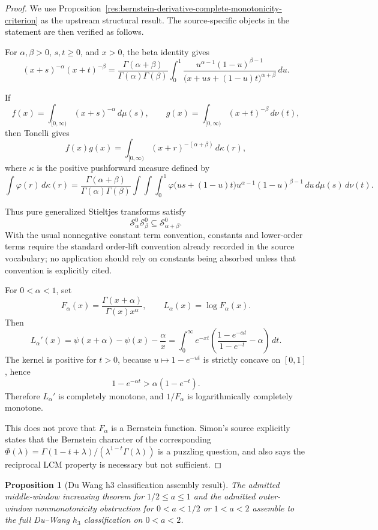 \documentclass[11pt]{article}
\numberwithin{equation}{section}
\newtheorem{proposition}[theorem]{Proposition}
\theoremstyle{definition}
\theoremstyle{remark}
\newcommand{\1}{\mathbf 1}
\begin{document}
\begin{proof}
We use Proposition~\ref{res:bernstein-derivative-complete-monotonicity-criterion} as the upstream structural result. The source-specific objects in the statement are then verified as follows.

For \(\alpha,\beta>0\), \(s,t\ge0\), and \(x>0\), the beta identity gives
\[
(x+s)^{-\alpha}(x+t)^{-\beta}
=
\frac{\Gamma(\alpha+\beta)}{\Gamma(\alpha)\Gamma(\beta)}
\int_0^1
\frac{u^{\alpha-1}(1-u)^{\beta-1}}
{\bigl(x+us+(1-u)t\bigr)^{\alpha+\beta}}
\,du.
\]

If
\[
f(x)=\int_{[0,\infty)}(x+s)^{-\alpha}\,d\mu(s),
\qquad
g(x)=\int_{[0,\infty)}(x+t)^{-\beta}\,d\nu(t),
\]
then Tonelli gives
\[
f(x)g(x)=\int_{[0,\infty)}(x+r)^{-(\alpha+\beta)}\,d\kappa(r),
\]
where \(\kappa\) is the positive pushforward measure defined by
\[
\int \varphi(r)\,d\kappa(r)
=
\frac{\Gamma(\alpha+\beta)}{\Gamma(\alpha)\Gamma(\beta)}
\int\!\!\int\!\!\int_0^1
\varphi\bigl(us+(1-u)t\bigr)
u^{\alpha-1}(1-u)^{\beta-1}
\,du\,d\mu(s)\,d\nu(t).
\]

Thus pure generalized Stieltjes transforms satisfy
\[
\mathcal S_\alpha^{0}\mathcal S_\beta^{0}\subseteq \mathcal S_{\alpha+\beta}^{0}.
\]
With the usual nonnegative constant term convention, constants and lower-order terms require the standard order-lift convention already recorded in the source vocabulary; no application should rely on constants being absorbed unless that convention is explicitly cited.

For \(0<\alpha<1\), set
\[
F_\alpha(x)=\frac{\Gamma(x+\alpha)}{\Gamma(x)x^\alpha},
\qquad
L_\alpha(x)=\log F_\alpha(x).
\]
Then
\[
L_\alpha'(x)
=
\psi(x+\alpha)-\psi(x)-\frac{\alpha}{x}
=
\int_0^\infty e^{-xt}
\left(
\frac{1-e^{-\alpha t}}{1-e^{-t}}-\alpha
\right)\,dt.
\]
The kernel is positive for \(t>0\), because \(u\mapsto 1-e^{-ut}\) is strictly concave on \([0,1]\), hence
\[
1-e^{-\alpha t}>\alpha(1-e^{-t}).
\]
Therefore \(L_\alpha'\) is completely monotone, and \(1/F_\alpha\) is logarithmically completely monotone.

This does not prove that \(F_\alpha\) is a Bernstein function. Simon's source explicitly states that the Bernstein character of the corresponding \(\Phi(\lambda)=\Gamma(1-t+\lambda)/(\lambda^{1-t}\Gamma(\lambda))\) is a puzzling question, and also says the reciprocal LCM property is necessary but not sufficient.
\end{proof}

\begin{proposition}[Du Wang h3 classification assembly result]
\label{res:du-wang-h3-classification-assembly-bridge}
The admitted middle-window increasing theorem for \(1/2\le a\le1\) and the admitted outer-window nonmonotonicity obstruction for \(0<a<1/2\) or \(1<a<2\) assemble to the full Du--Wang \(h_3\) classification on \(0<a<2\).
\end{proposition}
\end{document}
